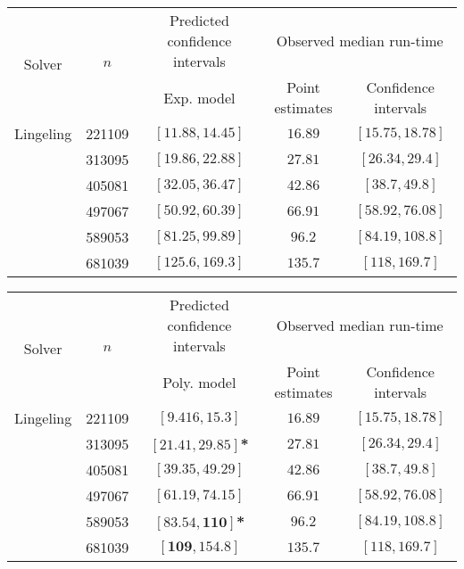 \begin{tabular}{ccccc}
\hline 
\multirow{2}{*}{Solver} & \multirow{2}{*}{$n$} & Predicted confidence intervals & \multicolumn{2}{c}{Observed median  run-time}\tabularnewline
 &  & Exp. model  & Point estimates  & Confidence intervals\tabularnewline
\hline 
\hline 
\multirow{0}{*}{Lingeling} & 221109 & $\left[11.88,14.45\right]$ & $16.89$ & $\left[15.75,18.78\right]$ \tabularnewline 
 & 313095 & $\left[19.86,22.88\right]$ & $27.81$ & $\left[26.34,29.4\right]$ \tabularnewline 
 & 405081 & $\left[32.05,36.47\right]$ & $42.86$ & $\left[38.7,49.8\right]$ \tabularnewline 
 & 497067 & $\mathbf{\left[50.92,60.39\right]}$ & $66.91$ & $\left[58.92,76.08\right]$ \tabularnewline 
 & 589053 & $\mathbf{\left[81.25,99.89\right]}$ & $96.2$ & $\left[84.19,108.8\right]$ \tabularnewline 
 & 681039 & $\mathbf{\left[125.6,169.3\right]}$ & $135.7$ & $\left[118,169.7\right]$ \tabularnewline 
\hline 
\end{tabular} 

\begin{tabular}{ccccc}
\hline 
\multirow{2}{*}{Solver} & \multirow{2}{*}{$n$} & Predicted confidence intervals & \multicolumn{2}{c}{Observed median  run-time}\tabularnewline
 &  & Poly. model  & Point estimates  & Confidence intervals\tabularnewline
\hline 
\hline 
\multirow{0}{*}{Lingeling} & 221109 & $\left[9.416,15.3\right]$ & $16.89$ & $\left[15.75,18.78\right]$ \tabularnewline 
 & 313095 & $\mathbf{\left[21.41,29.85\right]}$\textbf{*} & $27.81$ & $\left[26.34,29.4\right]$ \tabularnewline 
 & 405081 & $\mathbf{\left[39.35,49.29\right]}$ & $42.86$ & $\left[38.7,49.8\right]$ \tabularnewline 
 & 497067 & $\mathbf{\left[61.19,74.15\right]}$ & $66.91$ & $\left[58.92,76.08\right]$ \tabularnewline 
 & 589053 & $\mathbf{\left[83.54,110\right]}$\textbf{*} & $96.2$ & $\left[84.19,108.8\right]$ \tabularnewline 
 & 681039 & $\mathbf{\left[109,154.8\right]}$ & $135.7$ & $\left[118,169.7\right]$ \tabularnewline 
\hline 
\end{tabular} 


